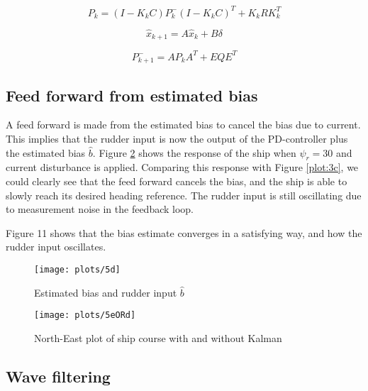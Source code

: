 \begin{equation}
    {P_k} = (I - {K_k}C)P_k^ - {(I - {K_k}C)^T} + {K_k}RK_k^T
\end{equation}

\begin{equation}
    {{\hat x}_{k + 1}} = A{{\hat x}_k} + B\delta 
\end{equation}

\begin{equation}
    P_{k + 1}^ -  = A{P_k}{A^T} + EQ{E^T}
\end{equation}


\newpage
\subsection{Feed forward from estimated bias}
A feed forward is made from the estimated bias to cancel the bias due to current. This implies that the rudder input is now the output of the PD-controller plus the estimated bias $\hat b$. Figure \ref{plot:5d} shows the response of the ship when ${\psi _r} = 30$ and current disturbance is applied. Comparing this response with Figure \ref{plot:3c}, we could clearly see that the feed forward cancels the bias, and the ship is able to slowly reach its desired heading reference. The rudder input is still oscillating due to measurement noise in the feedback loop. 

Figure 11 shows that the bias estimate converges in a satisfying way, and how the rudder input oscillates.

\begin{figure}[!htb]
    \caption{Estimated bias and rudder input $\hat b$}
    \centering
     \centerline{\texttt{[image: plots/5d]}}
    \label{plot:5d}
\end{figure}

\newpage
\begin{figure}[!htb]
    \caption{North-East plot of ship course with and without Kalman}
    \centering
     \centerline{\texttt{[image: plots/5eORd]}}
    \label{plot:5d}
\end{figure}


\subsection{Wave filtering}

